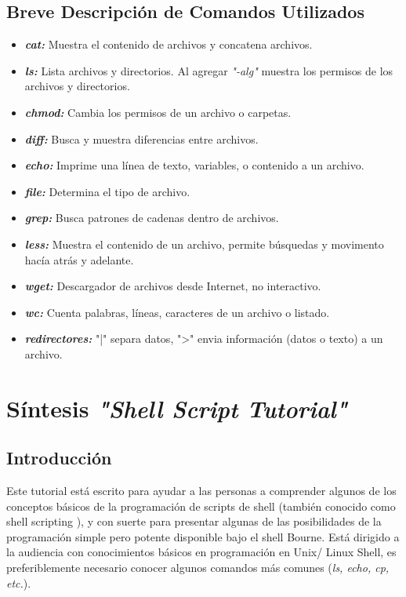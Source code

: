 \documentclass[12pt]{article}
\begin{document}
\subsection*{Breve Descripción de Comandos Utilizados}
\begin{itemize}
\item \textit{\textbf{cat: }}	Muestra el contenido de archivos y concatena archivos.
\item \textbf{\textit{ls: }} Lista archivos y directorios. Al agregar \textit{"-alg"} muestra los permisos de los archivos y directorios.
\item \textbf{\textit{chmod:}} Cambia los permisos de un archivo o carpetas.
\item \textbf{\textit{diff:}} Busca y muestra diferencias entre archivos.
\item \textit{\textbf{echo:}} Imprime una línea de texto, variables, o contenido a un archivo.
\item \textbf{\textit{file:}} Determina el tipo de archivo.
\item \textit{\textbf{grep:}} Busca patrones de cadenas dentro de archivos.
\item \textbf{\textit{less:}} Muestra el contenido de un archivo, permite búsquedas y movimento hacía atrás y adelante.
\item \textit{\textbf{wget:}} Descargador de archivos desde Internet, no interactivo.
\item \textbf{\textit{wc:}} Cuenta palabras, líneas, caracteres de un archivo o listado.
\item \textit{\textbf{redirectores:}} "|" separa datos, ">" envia información (datos o texto) a un archivo.
\end{itemize}

\section*{Síntesis \textbf{\textit{"Shell Script Tutorial"}}}
\subsection*{Introducción}

Este tutorial está escrito para ayudar a las personas a comprender algunos de los conceptos básicos de la programación de scripts de shell (también conocido como shell scripting ), y con suerte para presentar algunas de las posibilidades de la programación simple pero potente disponible bajo el shell Bourne. Está dirigido a la audiencia con conocimientos básicos en programación en Unix/ Linux Shell, es preferiblemente necesario conocer algunos comandos más comunes (\textit{ls, echo, cp, etc.}).
\end{document}

